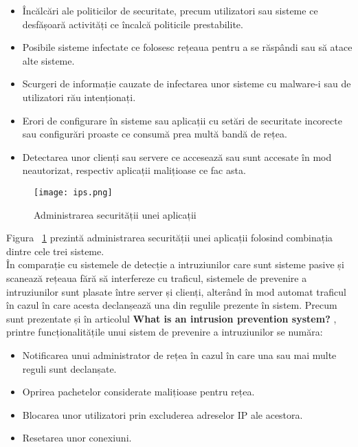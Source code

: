 \begin{itemize}
	\item  Încălcări ale politicilor de securitate, precum utilizatori sau sisteme ce desfășoară activități ce încalcă politicile prestabilite. 
	\item  Posibile sisteme infectate ce folosesc rețeaua pentru a se răspândi sau să atace alte sisteme. 
	\item  Scurgeri de informație cauzate de infectarea unor sisteme cu malware-i sau de utilizatori rău intenționați. 
	\item  Erori de configurare în sisteme sau aplicații cu setări de securitate incorecte sau configurări proaste ce consumă prea multă bandă de rețea. 
	\item  Detectarea unor clienți sau servere ce accesează sau sunt accesate în mod neautorizat, respectiv aplicații malițioase ce fac asta. 
\end{itemize}
\begin{figure}[h]
	\centering
	\texttt{[image: ips.png]}
	\caption{ Administrarea securității unei aplicații }
	\label{fig:ips-example}
\end{figure}

Figura ~\ref{fig:ips-example}  prezintă administrarea securității unei aplicații folosind combinația dintre cele trei sisteme.  \\

În comparație cu sistemele de detecție a intruziunilor care sunt sisteme pasive și scanează rețeaua fără să interfereze cu traficul, sistemele de prevenire a intruziunilor sunt plasate între server și clienți, alterând în mod automat traficul în cazul în care acesta declanșează una din regulile prezente în sistem. Precum sunt prezentate și în articolul  \textbf{What is an intrusion prevention system?} \cite{what_is_ips},  printre funcționalitățile unui sistem de prevenire a intruziunilor se număra:
\begin{itemize}
	\item  Notificarea unui administrator de rețea în cazul în care una sau mai multe reguli sunt declanșate. 
	\item  Oprirea pachetelor considerate malițioase pentru rețea.
	\item  Blocarea unor utilizatori prin excluderea adreselor IP ale acestora. 
	\item  Resetarea unor conexiuni. 
\end{itemize}


